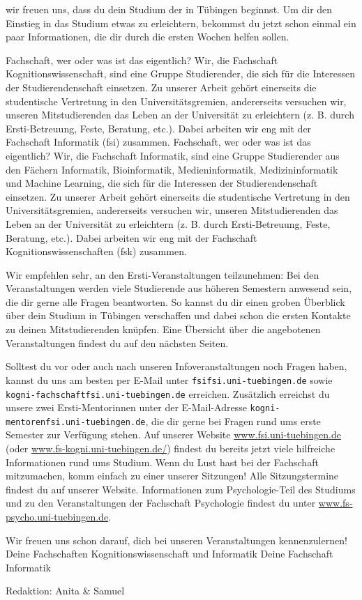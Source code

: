 \thispagestyle{firststyle}
wir freuen uns, dass du dein Studium der \studiengang in Tübingen beginnst.
Um dir den Einstieg in das Studium etwas zu erleichtern, bekommst du jetzt schon einmal
ein paar Informationen, die dir durch die ersten Wochen helfen sollen.

\ifkogwiss
\glqq Fachschaft\grqq, wer oder was ist das eigentlich? Wir, die Fachschaft Kognitionswissenschaft,
sind eine Gruppe Studierender, die sich für die Interessen der Studierendenschaft einsetzen. Zu unserer Arbeit
gehört einerseits die studentische Vertretung in den Universitätsgremien, andererseits versuchen wir, unseren
Mitstudierenden das Leben an der Universität zu erleichtern (z. B. durch Ersti-Betreuung, Feste, Beratung, etc.).
Dabei arbeiten wir eng mit der Fachschaft Informatik (fsi) zusammen.
\else
\glqq Fachschaft\grqq, wer oder was ist das eigentlich? Wir, die Fachschaft Informatik, sind eine Gruppe Studierender aus den Fächern
Informatik, Bioinformatik, Medieninformatik, Medizininformatik und Machine Learning, die sich für die Interessen der Studierendenschaft einsetzen. Zu unserer Arbeit
gehört einerseits die studentische Vertretung in den Universitätsgremien, andererseits versuchen wir, unseren
Mitstudierenden das Leben an der Universität zu erleichtern (z. B. durch Ersti-Betreuung, Feste, Beratung, etc.).
Dabei arbeiten wir eng mit der Fachschaft Kognitionswissenschaften (fsk) zusammen.
\fi

Wir empfehlen sehr, an den Ersti-Veranstaltungen teilzunehmen:
Bei den Veranstaltungen werden viele Studierende aus höheren Semestern anwesend sein, die dir gerne alle Fragen beantworten.
So kannst du dir einen groben Überblick über dein Studium in Tübingen verschaffen und dabei schon die ersten Kontakte zu deinen Mitstudierenden knüpfen.
Eine Übersicht über die angebotenen Veranstaltungen findest du auf den nächsten Seiten.

Solltest du vor oder auch nach unseren Infoveranstaltungen noch Fragen haben, kannst du uns
am besten per E-Mail unter \texttt{fsi\At fsi.uni-tuebingen.de}
\ifkogwiss
sowie \texttt{kogni-fachschaft\At fsi.uni-tuebingen.de}
\fi
erreichen.
\ifkogwiss
Zusätzlich erreichst du unsere zwei Ersti-Mentorinnen unter der E-Mail-Adresse \texttt{kogni-mentoren\At fsi.uni-tuebingen.de}, die dir gerne bei Fragen rund ums erste Semester zur Verfügung stehen.
\fi
Auf unserer Website \url{www.fsi.uni-tuebingen.de} (oder \url{www.fs-kogni.uni-tuebingen.de/}) findest du bereits
jetzt viele hilfreiche Informationen rund ums Studium. Wenn du Lust hast bei der Fachschaft mitzumachen,
komm einfach zu einer unserer Sitzungen! Alle Sitzungstermine findest du auf unserer Website.
\ifkogwiss  Informationen zum Psychologie-Teil des Studiums und zu den Veranstaltungen der
Fachschaft Psychologie findest du unter \url{www.fs-psycho.uni-tuebingen.de}.\fi

Wir freuen uns schon darauf, dich bei unseren Veranstaltungen kennenzulernen!\\
\ifkogwiss
Deine Fachschaften Kognitionswissenschaft und Informatik
\else
Deine Fachschaft Informatik
\par\hfill
{\footnotesize Redaktion: Anita \& Samuel}
\fi
\vfill
